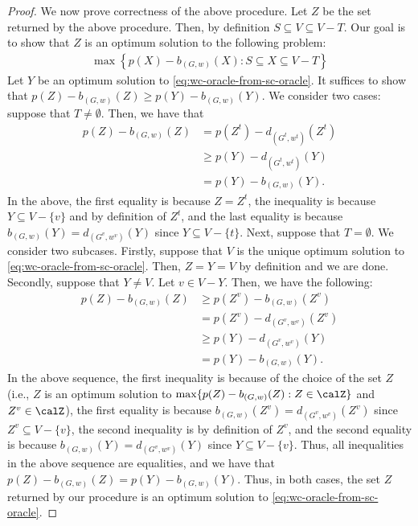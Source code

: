 \documentclass{article}
\begin{document}
\begin{proof}
We now prove correctness of the above procedure. Let $Z$ be the set returned by the above procedure. Then, by definition $S\subseteq V\subseteq V-T$. Our goal is to show that $Z$ is an optimum solution to the following problem:
\begin{align}
    \max\left\{p(X)-b_{(G, w)}(X): S\subseteq X\subseteq V-T\right\} \label{eq:wc-oracle-from-sc-oracle}
\end{align}
Let $Y$ be an optimum solution to \eqref{eq:wc-oracle-from-sc-oracle}. It suffices to show that $p(Z)-b_{(G, w)}(Z) \ge p(Y)-b_{(G, w)}(Y) $.   
We consider two cases: suppose that $T\neq \emptyset$. Then, we have that 
\begin{align*}
p(Z)-b_{(G, w)}(Z)
&=p(Z^t)-d_{(G^t, w^t)}(Z^t)\\
&\ge p(Y)-d_{(G^t, w^t)}(Y) \\
&= p(Y) - b_{(G, w)}(Y) .
\end{align*} 
In the above, the first equality is because $Z=Z^t$, the inequality is because $Y\subseteq V-\{v\}$ and by definition of $Z^t$, and the last equality is because $b_{(G, w)}(Y) = d_{(G^v, w^v)}(Y)$ since $Y\subseteq V-\{t\}$. 
Next, suppose that $T=\emptyset$. We consider two subcases. Firstly, suppose that $V$ is the unique optimum solution to \eqref{eq:wc-oracle-from-sc-oracle}. Then, $Z=Y=V$ by definition and we are done. 
Secondly, suppose that $Y\neq V$. Let $v\in V-Y$.  
Then, we have the following:
\begin{align*}
p(Z)-b_{(G, w)}(Z)
&\ge p(Z^v) - b_{(G, w)}(Z^v) \\
&=p(Z^v)-d_{(G^v, w^v)}(Z^v) \\
&\ge p(Y)-d_{(G^v, w^v)}(Y) \\
&=p(Y)-b_{(G, w)}(Y).
\end{align*} 
In the above sequence, the first inequality is because of the choice of the set $Z$ (i.e., $Z$ is an optimum solution to $\max\{p(Z)-b_{(G, w)}(Z): Z\in \calZ\}$ and $Z^v \in \calZ$), the first equality is because  $b_{(G, w)}(Z^v) = d_{(G^v, w^v)}(Z^v)$ since $Z^v\subseteq V-\{v\}$, the second inequality is by definition of $Z^v$, and the second equality is because $b_{(G, w)}(Y) = d_{(G^v, w^v)}(Y)$ since $Y\subseteq V-\{v\}$. Thus, all inequalities in the above sequence are equalities, and we have that $p(Z)-b_{(G, w)}(Z) = p(Y)-b_{(G, w)}(Y)$. Thus, in both cases, the set $Z$ returned by our procedure is an optimum solution to \eqref{eq:wc-oracle-from-sc-oracle}.


\end{proof}
\end{document}
